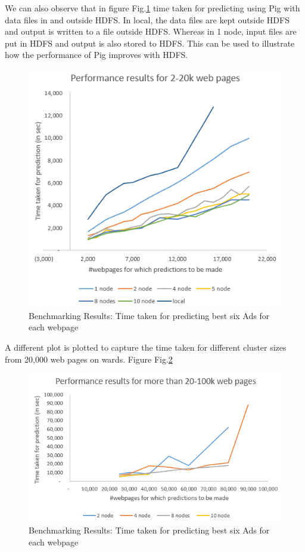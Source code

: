 \documentclass[9pt,twocolumn,twoside]{../../styles/osajnl}
\begin{document}
We can also observe that in figure Fig.\ref{fig:xlarge_20k} time taken for predicting using Pig with data files in and outside HDFS. In local, the data files are kept outside HDFS and output is written to a file outside HDFS. Whereas in 1 node, input files are put in HDFS and output is also stored to HDFS. This can be used to illustrate how the performance of Pig improves with HDFS.

\begin{figure}[hptb]
\centering
\includegraphics[width=\linewidth]{images/xlarge_20k.PNG}
\caption{ Benchmarking Results: Time taken for predicting best six Ads for each webpage}
\label{fig:xlarge_20k}
\end{figure}

A different plot is plotted to capture the time taken for different cluster sizes from 20,000 web pages on wards. Figure Fig.\ref{fig:xlarge_100k}

\begin{figure}[hptb]
\centering
\includegraphics[width=\linewidth]{images/xlarge_100k.PNG}
\caption{ Benchmarking Results: Time taken for predicting best six Ads for each webpage}
\label{fig:xlarge_100k}
\end{figure}
\end{document}
